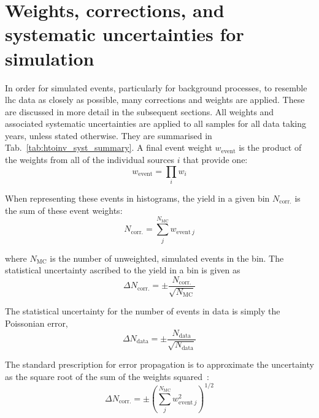 \section{Weights, corrections, and systematic uncertainties for simulation}
\label{sec:htoinv_mc_corrections}


In order for simulated events, particularly for background processes, to resemble \acrshort{lhc} data as closely as possible, many corrections and weights are applied. These are discussed in more detail in the subsequent sections. All weights and associated systematic uncertainties are applied to all samples for all data taking years, unless stated otherwise. They are summarised in Tab.~\ref{tab:htoinv_syst_summary}. A final event weight $w_{\mathrm{event}}$ is the product of the weights from all of the individual sources $i$ that provide one:
\begin{equation}
    w_{\mathrm{event}} = \prod_i w_i
    \label{eq:event_weight}
\end{equation}

When representing these events in histograms, the yield in a given bin $N_{\mathrm{corr.}}$ is the sum of these event weights:
\begin{equation}
    N_{\mathrm{corr.}} = \sum_j^{N_{\mathrm{MC}}} w_{\mathrm{event} \ j}
    \label{eq:bin_weight}
\end{equation}

where $N_{\mathrm{MC}}$ is the number of unweighted, simulated events in the bin. The statistical uncertainty ascribed to the yield in a bin is given as
\begin{equation}
    \Delta N_{\mathrm{corr.}} = \pm \frac{ N_{\mathrm{corr.}} }{ \sqrt{N_{\mathrm{MC}}} }
    \label{eq:uncertainty_mc_ours}
\end{equation}

The statistical uncertainty for the number of events in data is simply the Poissonian error,
\begin{equation}
    \Delta N_{\mathrm{data}} = \pm \frac{ N_{\mathrm{data}} }{ \sqrt{N_{\mathrm{data}}} }
    \label{eq:uncertainty_data}
\end{equation}

The standard prescription for error propagation is to approximate the uncertainty as the square root of the sum of the weights squared~\cite{bevington2003data}:
\begin{equation}
    \Delta N_{\mathrm{corr.}} = \pm \left( \sum_j^{N_{\mathrm{MC}}} w_{\mathrm{event} \ j}^2 \right) ^{1/2}
    \label{eq:uncertainty_mc_normal}
\end{equation}

